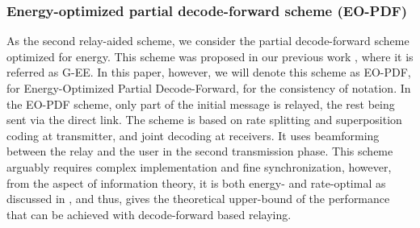 \documentclass[journal]{IEEEtran}
\theoremstyle{definition}
\begin{document}
\subsubsection{Energy-optimized partial decode-forward scheme (EO-PDF)}

As the second relay-aided scheme, we consider the partial decode-forward scheme optimized for energy. This scheme was proposed in our previous work \cite{Journal1}, where it is referred as G-EE. In this paper, however, we will denote this scheme as EO-PDF, for Energy-Optimized Partial Decode-Forward, for the consistency of notation.
In the EO-PDF scheme, only part of the initial message is relayed, the rest being sent via the direct link. The scheme is based on rate splitting and superposition coding at transmitter, and joint decoding at receivers. It uses beamforming between the relay and the user in the second transmission phase. This scheme arguably requires complex implementation and fine synchronization, however, from the aspect of information theory, it is both energy- and rate-optimal as discussed in \cite{Journal1}, and thus, gives the theoretical upper-bound of the performance that can be achieved with decode-forward based relaying.
\end{document}
